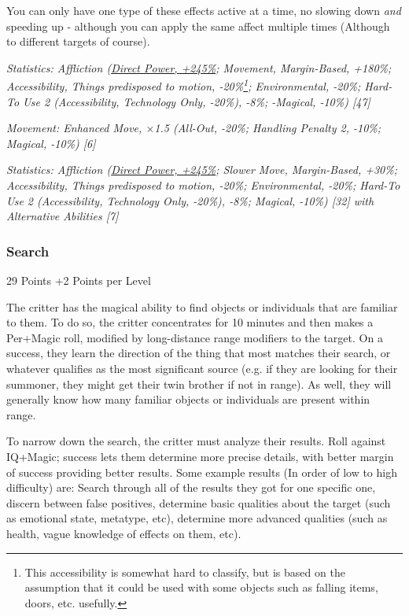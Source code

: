 \begin{multicols*}{3}
	You can only have one type of these effects active at a time, no slowing down \textit{and} speeding up - although you can apply the same affect multiple times (Although to different targets of course).
	
	\textcolor{OliveGreen}{\textit{Statistics: Affliction (\hyperref[cp_ct]{Direct Power, +245\%}; Movement, Margin-Based, +180\%; Accessibility, Things predisposed to motion, -20\%\footnote{This accessibility is somewhat hard to classify, but is based on the assumption that it could be used with some objects such as falling items, doors, etc. usefully.}; Environmental, -20\%; Hard-To Use 2 (Accessibility, Technology Only, -20\%), -8\%; -Magical, -10\%) [47]}}
	
	\textcolor{OliveGreen}{\textit{Movement: Enhanced Move, \(\times\)1.5 (All-Out, -20\%; Handling Penalty 2, -10\%; Magical, -10\%) [6]}}
	
	\textcolor{OliveGreen}{\textit{Statistics: Affliction (\hyperref[cp_ct]{Direct Power, +245\%}; Slower Move, Margin-Based, +30\%; Accessibility, Things predisposed to motion, -20\%; Environmental, -20\%; Hard-To Use 2 (Accessibility, Technology Only, -20\%), -8\%; Magical, -10\%) [32] with Alternative Abilities [7]}}
	
	
	\subsubsection{Search}\label{search}
	\begin{flushright}
		29 Points +2 Points per Level
	\end{flushright}
	
	The critter has the magical ability to find objects or individuals that are familiar to them. To do so, the critter concentrates for 10 minutes and then makes a Per+Magic roll, modified by long-distance range modifiers to the target. On a success, they learn the direction of the thing that most matches their search, or whatever qualifies as the most significant source (e.g. if they are looking for their summoner, they might get their twin brother if not in range). As well, they will generally know how many familiar objects or individuals are present within range. 
	
	To narrow down the search, the critter must analyze their results. Roll against IQ+Magic; success lets them determine more precise details, with better margin of success providing better results. Some example results (In order of low to high difficulty) are: Search through all of the results they got for one specific one, discern between false positives, determine basic qualities about the target (such as emotional state, metatype, etc), determine more advanced qualities (such as health, vague knowledge of effects on them, etc).
	

\end{multicols*}
